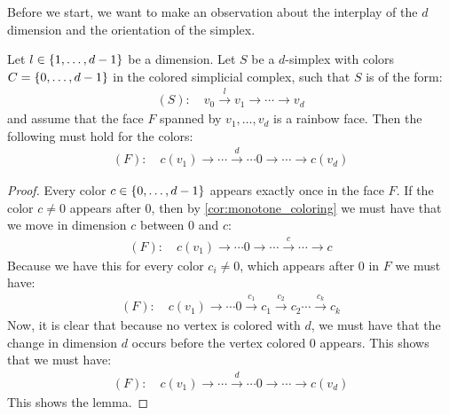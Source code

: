 Before we start, we want to make an observation about the interplay of the $d$ dimension and the orientation of the simplex.
\begin{lemma}\label{lem:position_of_d_in_simplex}
	Let $l \in \left\{1, \dots, d-1\right\}$ be a dimension. Let $S$ be a $d$-simplex with colors $C = \left\{0, \dots, d-1\right\}$ in the colored simplicial complex, such that $S$ is of the form:
	\begin{align*}
		(S): \quad v_0 \xrightarrow{l} v_1 \xrightarrow{} \cdots \xrightarrow{} v_d
	\end{align*}
	and assume that the face $F$ spanned by $v_1, \dots, v_d$ is a rainbow face. Then the following must hold for the colors:
	\begin{align*}
		(F): \quad c(v_1) \xrightarrow{}  \cdots \xrightarrow{d} \cdots  0 \xrightarrow{} \cdots \xrightarrow{} c(v_d)
	\end{align*}
\end{lemma}
\begin{proof}
	Every color $c \in \left\{0, \dots, d-1\right\}$ appears exactly once in the face $F$. If the color $c \neq 0$ appears after $0$, then by \cref{cor:monotone_coloring} we must have that we move in dimension $c$ between $0$ and $c$:
	\begin{align*}
		(F): \quad c(v_1) \xrightarrow{} \cdots  0 \xrightarrow{} \cdots \xrightarrow{c} \cdots \xrightarrow{} c
	\end{align*}
	Because we have this for every color $c_i \neq 0$, which appears after $0$ in $F$ we must have:
	\begin{align*}
		(F): \quad c(v_1) \xrightarrow{} \cdots  0 \xrightarrow{c_1} c_1 \xrightarrow{c_2} c_2 \cdots \xrightarrow{c_k} c_k
	\end{align*}
	Now, it is clear that because no vertex is colored with $d$, we must have that the change in dimension $d$ occurs before the vertex colored $0$ appears. This shows that we must have:
	\begin{align*}
		(F): \quad c(v_1) \xrightarrow{}  \cdots \xrightarrow{d} \cdots  0 \xrightarrow{} \cdots \xrightarrow{} c(v_d)
	\end{align*}
	This shows the lemma.
\end{proof}

